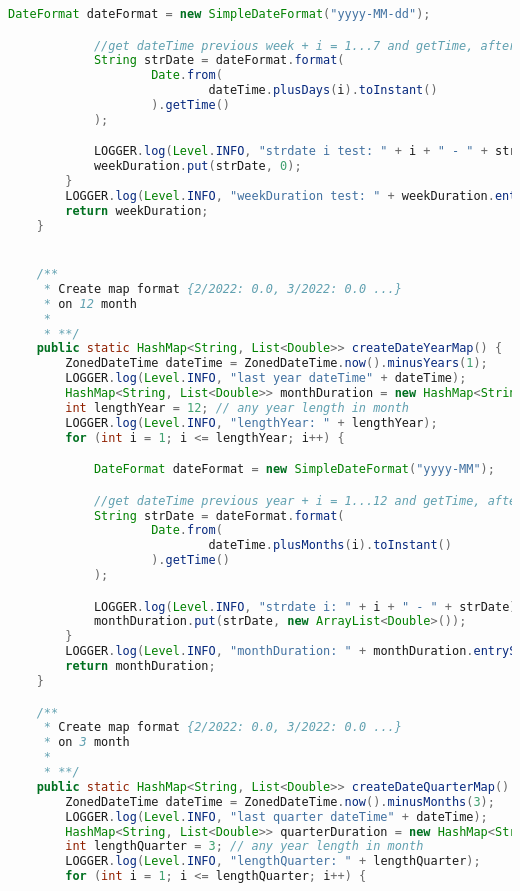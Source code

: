 \begin{lstlisting}[language=Java]
            DateFormat dateFormat = new SimpleDateFormat("yyyy-MM-dd");

            //get dateTime previous week + i = 1...7 and getTime, after in strDate=2022-03-01
            String strDate = dateFormat.format(
                    Date.from(
                            dateTime.plusDays(i).toInstant()
                    ).getTime()
            );

            LOGGER.log(Level.INFO, "strdate i test: " + i + " - " + strDate);
            weekDuration.put(strDate, 0);
        }
        LOGGER.log(Level.INFO, "weekDuration test: " + weekDuration.entrySet());
        return weekDuration;
    }


    /**
     * Create map format {2/2022: 0.0, 3/2022: 0.0 ...}
     * on 12 month
     *
     * **/
    public static HashMap<String, List<Double>> createDateYearMap() {
        ZonedDateTime dateTime = ZonedDateTime.now().minusYears(1);
        LOGGER.log(Level.INFO, "last year dateTime" + dateTime);
        HashMap<String, List<Double>> monthDuration = new HashMap<String, List<Double>>();
        int lengthYear = 12; // any year length in month
        LOGGER.log(Level.INFO, "lengthYear: " + lengthYear);
        for (int i = 1; i <= lengthYear; i++) {

            DateFormat dateFormat = new SimpleDateFormat("yyyy-MM");

            //get dateTime previous year + i = 1...12 and getTime, after in strDate=2022-03
            String strDate = dateFormat.format(
                    Date.from(
                            dateTime.plusMonths(i).toInstant()
                    ).getTime()
            );

            LOGGER.log(Level.INFO, "strdate i: " + i + " - " + strDate);
            monthDuration.put(strDate, new ArrayList<Double>());
        }
        LOGGER.log(Level.INFO, "monthDuration: " + monthDuration.entrySet());
        return monthDuration;
    }

    /**
     * Create map format {2/2022: 0.0, 3/2022: 0.0 ...}
     * on 3 month
     *
     * **/
    public static HashMap<String, List<Double>> createDateQuarterMap() {
        ZonedDateTime dateTime = ZonedDateTime.now().minusMonths(3);
        LOGGER.log(Level.INFO, "last quarter dateTime" + dateTime);
        HashMap<String, List<Double>> quarterDuration = new HashMap<String, List<Double>>();
        int lengthQuarter = 3; // any year length in month
        LOGGER.log(Level.INFO, "lengthQuarter: " + lengthQuarter);
        for (int i = 1; i <= lengthQuarter; i++) {


\end{lstlisting}
